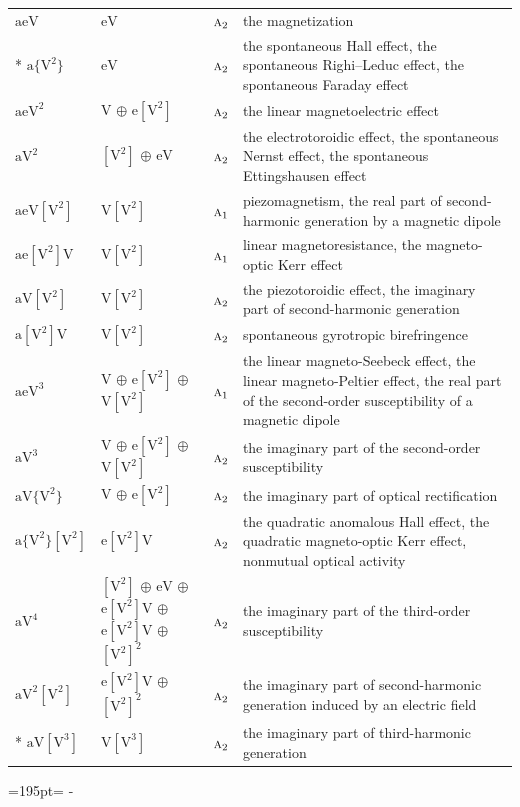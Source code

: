 \documentclass[10pt,a4paper]{article}
\newcommand{\needspace}[1]{\par\penalty-100\begingroup\dimen0=#1\relax\dimen2=\pagegoal
  \advance\dimen2-\pagetotal\ifdim\dimen0>\dimen2\relax\ifdim\dimen2>0pt\vfil\break\fi\fi
  \endgroup}
\numberwithin{equation}{section}
\newcommand{\irr}[1]{\text{\normalfont\scshape #1}}
\newcommand{\jahn}[1]{\mathrm{#1}}
\newlength{\fillwidth}\newlength{\cellwidth}\newlength{\colwidth}
\begin{document}
{\begin{longtable}{@{}lll>{\RaggedRight\arraybackslash}p{\fillwidth}@{}}
\bottomrule\endfoot\endlastfoot
$\jahn{aeV}$ & $\jahn{eV}$ & $\irr{a}_{2}$ & the magnetization\\*
$\jahn{a\{V^{2}\}}$ & $\jahn{eV}$ & $\irr{a}_{2}$ & the spontaneous Hall effect, the spontaneous Righi–Leduc effect, the spontaneous Faraday effect\\
$\jahn{aeV^{2}}$ & $\jahn{V}$ $\oplus$ $\jahn{e[V^{2}]}$ & $\irr{a}_{2}$ & the linear magnetoelectric effect\\
$\jahn{aV^{2}}$ & $\jahn{[V^{2}]}$ $\oplus$ $\jahn{eV}$ & $\irr{a}_{2}$ & the electrotoroidic effect, the spontaneous Nernst effect, the spontaneous Ettingshausen effect\\
$\jahn{aeV[V^{2}]}$ & $\jahn{V[V^{2}]}$ & $\irr{a}_{1}$ & piezomagnetism, the real part of second-harmonic generation by a magnetic dipole\\
$\jahn{ae[V^{2}]V}$ & $\jahn{V[V^{2}]}$ & $\irr{a}_{1}$ & linear magnetoresistance, the magneto-optic Kerr effect\\
$\jahn{aV[V^{2}]}$ & $\jahn{V[V^{2}]}$ & $\irr{a}_{2}$ & the piezotoroidic effect, the imaginary part of second-harmonic generation\\
$\jahn{a[V^{2}]V}$ & $\jahn{V[V^{2}]}$ & $\irr{a}_{2}$ & spontaneous gyrotropic birefringence\\
$\jahn{aeV^{3}}$ & $\jahn{V}$ $\oplus$ $\jahn{e[V^{2}]}$ $\oplus$ $\jahn{V[V^{2}]}$ & $\irr{a}_{1}$ & the linear magneto-Seebeck effect, the linear magneto-Peltier effect, the real part of the second-order susceptibility of a magnetic dipole\\
$\jahn{aV^{3}}$ & $\jahn{V}$ $\oplus$ $\jahn{e[V^{2}]}$ $\oplus$ $\jahn{V[V^{2}]}$ & $\irr{a}_{2}$ & the imaginary part of the second-order susceptibility\\
$\jahn{aV\{V^{2}\}}$ & $\jahn{V}$ $\oplus$ $\jahn{e[V^{2}]}$ & $\irr{a}_{2}$ & the imaginary part of optical rectification\\
$\jahn{a\{V^{2}\}[V^{2}]}$ & $\jahn{e[V^{2}]V}$ & $\irr{a}_{2}$ & the quadratic anomalous Hall effect, the quadratic magneto-optic Kerr effect, nonmutual optical activity\\
$\jahn{aV^{4}}$ & $\jahn{[V^{2}]}$ $\oplus$ $\jahn{eV}$ $\oplus$ $\jahn{e[V^{2}]V}$ $\oplus$ $\jahn{e[V^{2}]V}$ $\oplus$ $\jahn{[V^{2}]^{2}}$ & $\irr{a}_{2}$ & the imaginary part of the third-order susceptibility\\
$\jahn{aV^{2}[V^{2}]}$ & $\jahn{e[V^{2}]V}$ $\oplus$ $\jahn{[V^{2}]^{2}}$ & $\irr{a}_{2}$ & the imaginary part of second-harmonic generation induced by an electric field\\*
$\jahn{aV[V^{3}]}$ & $\jahn{V[V^{3}]}$ & $\irr{a}_{2}$ & the imaginary part of third-harmonic generation\\
\bottomrule\end{longtable}}
\needspace{195pt}
\end{document}
